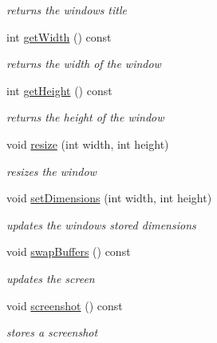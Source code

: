 \begin{DoxyCompactItemize}
\begin{DoxyCompactList}\small\item\em returns the window\textquotesingle{}s title \end{DoxyCompactList}\item 
\mbox{\label{classnta_1_1Window_ac6cb1a31bb8c219e189ca5f88e25dd45}} 
int \hyperlink{classnta_1_1Window_ac6cb1a31bb8c219e189ca5f88e25dd45}{get\+Width} () const
\begin{DoxyCompactList}\small\item\em returns the width of the window \end{DoxyCompactList}\item 
\mbox{\label{classnta_1_1Window_a0daae9b6ad0a0ea834f90e86a9416f88}} 
int \hyperlink{classnta_1_1Window_a0daae9b6ad0a0ea834f90e86a9416f88}{get\+Height} () const
\begin{DoxyCompactList}\small\item\em returns the height of the window \end{DoxyCompactList}\item 
\mbox{\label{classnta_1_1Window_a23b55b95d017fe35655ed1287869bdf1}} 
void \hyperlink{classnta_1_1Window_a23b55b95d017fe35655ed1287869bdf1}{resize} (int width, int height)
\begin{DoxyCompactList}\small\item\em resizes the window \end{DoxyCompactList}\item 
\mbox{\label{classnta_1_1Window_a3dd8aab88817189b409643d75e476597}} 
void \hyperlink{classnta_1_1Window_a3dd8aab88817189b409643d75e476597}{set\+Dimensions} (int width, int height)
\begin{DoxyCompactList}\small\item\em updates the window\textquotesingle{}s stored dimensions \end{DoxyCompactList}\item 
\mbox{\label{classnta_1_1Window_a5fdc643079410c14855a260ace84478e}} 
void \hyperlink{classnta_1_1Window_a5fdc643079410c14855a260ace84478e}{swap\+Buffers} () const
\begin{DoxyCompactList}\small\item\em updates the screen \end{DoxyCompactList}\item 
\mbox{\label{classnta_1_1Window_aa144f6bb014aaad3c91c3f3e6ad56f9c}} 
void \hyperlink{classnta_1_1Window_aa144f6bb014aaad3c91c3f3e6ad56f9c}{screenshot} () const
\begin{DoxyCompactList}\small\item\em stores a screenshot \end{DoxyCompactList}\end{DoxyCompactItemize}
